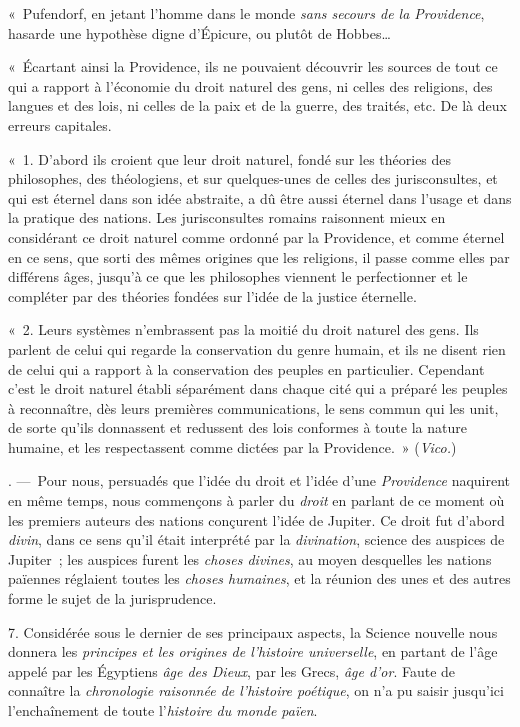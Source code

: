 \documentclass[french,twoside]{book} %
\newcommand\chapterclose{} %
\begin{document}
{« Pufendorf, en jetant l’homme dans le monde {\itshape sans secours de la Providence}, hasarde une hypothèse digne d’Épicure, ou plutôt de Hobbes…\par
« Écartant ainsi la Providence, ils ne pouvaient découvrir les sources de tout ce qui a rapport à l’économie du droit naturel des gens, ni celles des religions, des langues et des lois, ni celles de la paix et de la guerre, des traités, etc. De là deux erreurs capitales.\par
« 1. D’abord ils croient que leur droit naturel, fondé sur les théories des philosophes, des théologiens, et sur quelques-unes de celles des jurisconsultes, et qui est éternel dans son idée abstraite, a dû être aussi éternel dans l’usage et dans la pratique des nations. Les jurisconsultes romains raisonnent mieux en considérant ce droit naturel comme ordonné par la Providence, et comme éternel en ce sens, que sorti des mêmes origines que les religions, il passe comme elles par différens âges, jusqu’à ce que les philosophes viennent le perfectionner et le compléter par des théories fondées sur l’idée de la justice éternelle.\par
« 2. Leurs systèmes n’embrassent pas la moitié du droit naturel des gens. Ils parlent de celui qui regarde la conservation du genre humain, et ils ne disent rien de celui qui a rapport à la conservation des peuples en particulier. Cependant c’est le droit naturel établi séparément dans chaque cité qui a préparé les peuples à reconnaître, dès leurs premières communications, le sens commun qui les unit, de sorte qu’ils donnassent et redussent des lois conformes à toute la nature humaine, et les respectassent comme dictées par la Providence. » ({\itshape Vico.})
}. — Pour nous, persuadés que l’idée  du droit et l’idée d’une {\itshape Providence} naquirent en même temps, nous commençons à parler du {\itshape droit} en parlant de ce moment où les premiers auteurs des nations conçurent l’idée de Jupiter. Ce droit fut d’abord {\itshape divin}, dans ce sens qu’il était interprété par la {\itshape divination}, science des auspices de Jupiter ; les auspices furent les {\itshape choses divines}, au moyen desquelles les nations païennes réglaient toutes les {\itshape choses humaines}, et la réunion des unes et des autres forme le sujet de la jurisprudence.\par
7. Considérée sous le dernier de ses principaux aspects, la Science nouvelle nous donnera les {\itshape principes et les origines de l’histoire universelle}, en partant de l’âge appelé par les Égyptiens {\itshape âge des Dieux},  par les Grecs, {\itshape âge d’or}. Faute de connaître la {\itshape chronologie raisonnée de l’histoire poétique}, on n’a pu saisir jusqu’ici l’enchaînement de toute l’{\itshape histoire du monde païen}.
\chapterclose
\end{document}
